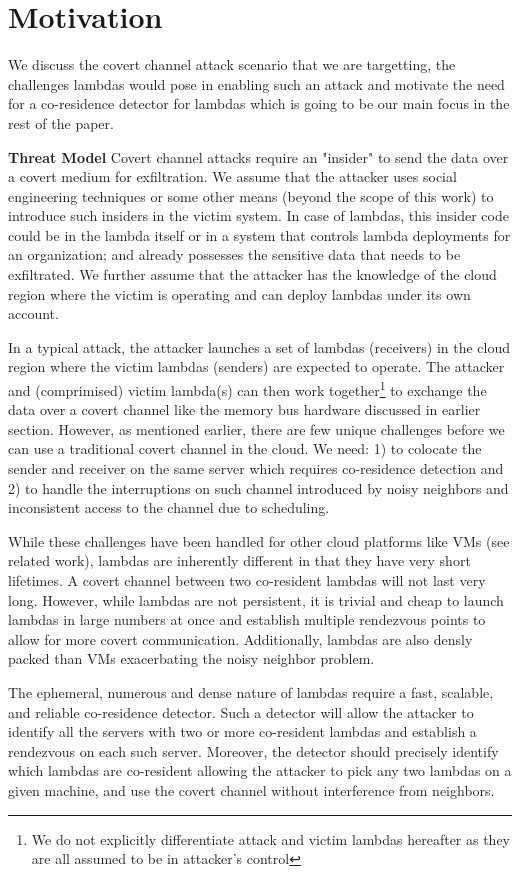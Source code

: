 
\section{Motivation}
\label{sec:motivation}

We discuss the covert channel attack scenario that we are targetting, the challenges 
lambdas would pose in enabling such an attack and motivate the need for a 
co-residence detector for lambdas which is going to be our main focus in the rest of 
the paper. 

\textbf{Threat Model}
Covert channel attacks require an "insider" to send the data over a covert 
medium for exfiltration. We assume that the attacker uses social engineering 
techniques or some other means (beyond the scope of this work) to introduce  
such insiders in the victim system. In case of lambdas, this insider code could be 
in the lambda itself or in a system that controls lambda deployments for an 
organization; and already possesses the sensitive data that needs to be exfiltrated. 
We further assume that the attacker has the knowledge of the cloud region 
where the victim is operating and can deploy lambdas under its own account.

In a typical attack, the attacker launches a set of  lambdas (receivers) in the 
cloud region where the victim lambdas 
(senders) are expected to operate. The attacker and 
(comprimised) victim lambda(s) can then work together\footnote{We do not explicitly
differentiate attack and victim lambdas hereafter as they are all assumed 
to be in attacker's control} to exchange the data over 
a covert channel like the memory bus hardware discussed in earlier section.
However, as mentioned earlier, there are few unique challenges before we can use
a traditional covert channel in the cloud. We need: 1) to colocate the sender 
and receiver on the same server which requires co-residence detection and 2) to handle
the interruptions on such channel introduced by noisy neighbors and inconsistent 
access to the channel due to scheduling.

While these challenges have been handled for other cloud platforms like VMs 
(see related work), lambdas are inherently different in that 
they have very short lifetimes. A covert
channel between two co-resident lambdas will not last very long. However, while
lambdas are not persistent, it is trivial and cheap to launch lambdas in large numbers at
once and establish multiple rendezvous points to allow for more covert communication.
Additionally, lambdas are also densly packed than VMs
exacerbating the noisy neighbor problem.

The ephemeral, numerous and dense nature of lambdas require a fast,
scalable, and reliable co-residence detector. Such a  
detector will allow the attacker to identify all the servers with two or more 
co-resident lambdas and establish a rendezvous on each such server. 
Moreover, the detector should precisely identify which lambdas are co-resident 
allowing the attacker to pick any two lambdas on a given machine, 
and use the covert channel without interference from neighbors. 



